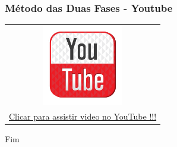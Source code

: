\documentclass{beamer}
\begin{document}
\begin{frame}
	\frametitle{Método das Duas Fases - Youtube} 
	\centering
	\begin{table}
		\begin{tabular}{c}
			\includegraphics[width=3.5cm,height=3.5cm]{youtube.png} \\
			\href{https://www.youtube.com/watch?v=PtT2ddGg5SQ}{Clicar para assistir video no YouTube !!!}
		\end{tabular}
	\end{table}
\end{frame} 




\begin{frame}
\Huge{\centerline{Fim}}
\end{frame}

\end{document}
